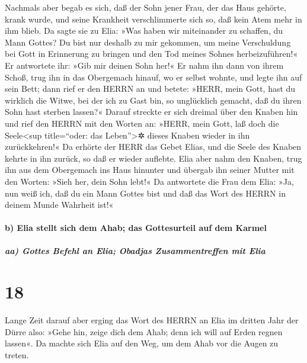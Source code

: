 Nachmals aber begab es sich, daß der Sohn jener Frau, der
das Haus gehörte, krank wurde, und seine Krankheit verschlimmerte sich
so, daß kein Atem mehr in ihm blieb. Da sagte sie zu
Elia: »Was haben wir miteinander zu schaffen, du Mann Gottes? Du bist
nur deshalb zu mir gekommen, um meine Verschuldung bei Gott in
Erinnerung zu bringen und den Tod meines Sohnes herbeizuführen!«
Er antwortete ihr: »Gib mir deinen Sohn her!« Er nahm ihn
dann von ihrem Schoß, trug ihn in das Obergemach hinauf, wo er selbst
wohnte, und legte ihn auf sein Bett; dann rief er den
HERRN an und betete: »HERR, mein Gott, hast du wirklich die Witwe, bei
der ich zu Gast bin, so unglücklich gemacht, daß du ihren Sohn hast
sterben lassen?« Darauf streckte er sich dreimal über den
Knaben hin und rief den HERRN mit den Worten an: »HERR, mein Gott, laß
doch die Seele\textless sup title=``oder: das Leben''\textgreater✲
dieses Knaben wieder in ihn zurückkehren!« Da erhörte der
HERR das Gebet Elias, und die Seele des Knaben kehrte in ihn zurück, so
daß er wieder auflebte. Elia aber nahm den Knaben, trug
ihn aus dem Obergemach ins Haus hinunter und übergab ihn seiner Mutter
mit den Worten: »Sieh her, dein Sohn lebt!« Da antwortete
die Frau dem Elia: »Ja, nun weiß ich, daß du ein Mann Gottes bist und
daß das Wort des HERRN in deinem Munde Wahrheit ist!«

\hypertarget{b-elia-stellt-sich-dem-ahab-das-gottesurteil-auf-dem-karmel}{%
\paragraph{b) Elia stellt sich dem Ahab; das Gottesurteil auf dem
Karmel}\label{b-elia-stellt-sich-dem-ahab-das-gottesurteil-auf-dem-karmel}}

\hypertarget{aa-gottes-befehl-an-elia-obadjas-zusammentreffen-mit-elia}{%
\subparagraph{aa) Gottes Befehl an Elia; Obadjas Zusammentreffen mit
Elia}\label{aa-gottes-befehl-an-elia-obadjas-zusammentreffen-mit-elia}}

\hypertarget{section-17}{%
\section{18}\label{section-17}}

Lange Zeit darauf aber erging das Wort des HERRN an Elia
im dritten Jahr der Dürre also: »Gehe hin, zeige dich dem Ahab; denn ich
will auf Erden regnen lassen«. Da machte sich Elia auf den
Weg, um dem Ahab vor die Augen zu treten.

